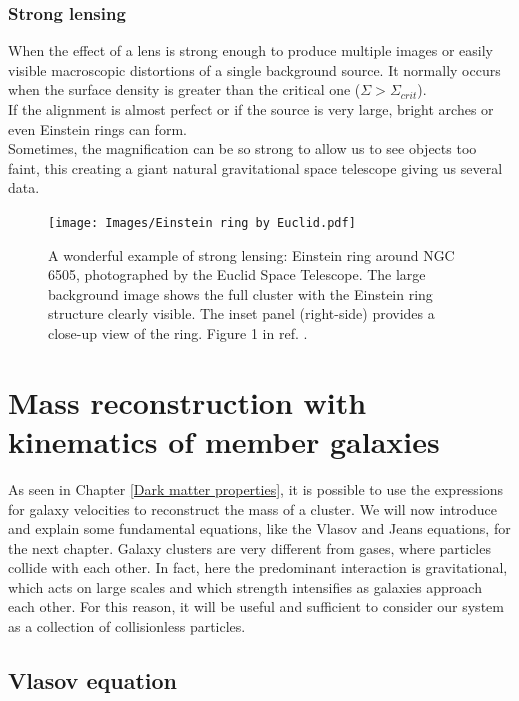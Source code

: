 \subsubsection{Strong lensing}
When the effect of a lens is strong enough to produce multiple images or easily visible macroscopic distortions of a single background source. It normally occurs when the surface density is greater than the critical one ($\Sigma > \Sigma_{crit}$).\\
If the alignment is almost perfect or if the source is very large, bright arches or even Einstein rings can form.\\ Sometimes, the magnification can be so strong to allow us to see objects too faint, this creating a giant natural gravitational space telescope giving us several data.
\begin{figure}[h!]
    \centering
    \texttt{[image: Images/Einstein ring by Euclid.pdf]}
    \caption[Einstein ring around NGC 6505 photographed by Euclid]{A wonderful example of strong lensing: Einstein ring around NGC 6505, photographed by the Euclid Space Telescope. The large background image shows the full cluster with the Einstein ring structure clearly visible. The inset panel (right-side) provides a close-up view of the ring. Figure 1 in ref. \cite{Einstein_ring_Euclid_image}.}
    \label{fig:Einstein ring by Euclid}
\end{figure}

\clearpage

\section{Mass reconstruction with kinematics of member galaxies}
As seen in Chapter \ref{Dark matter properties}, it is possible to use the expressions for galaxy velocities to reconstruct the mass of a cluster. We will now introduce and explain some fundamental equations, like the Vlasov and Jeans equations, for the next chapter.
Galaxy clusters are very different from gases, where particles collide with each other. In fact, here the predominant interaction is gravitational, which acts on large scales and which strength intensifies as galaxies approach each other. For this reason, it will be useful and sufficient to consider our system as a collection of collisionless particles.

\subsection{Vlasov equation}

